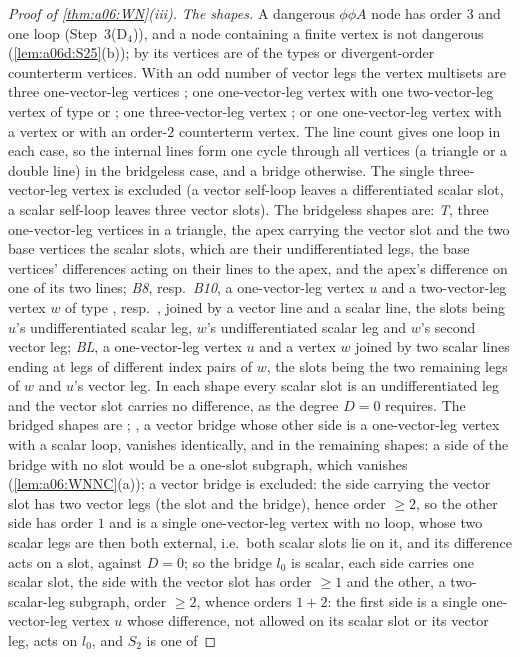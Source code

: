 
\begin{proof}[Proof of \cref{thm:a06:WN}\textup{(iii)}]
\emph{The shapes.} A dangerous $\phi\phi A$ node has order $3$ and one loop (Step~3(D$_4$)), and a node containing a finite \cite[(1.7)]{Ba3} vertex is not dangerous (\cref{lem:a06d:S25}(b)); by \cite[p.~429]{Ba3} its vertices are of the types \cite[(1.6)--(1.8), (1.10)]{Ba3} or divergent-order counterterm vertices. With an odd number of vector legs the vertex multisets are three one-vector-leg vertices \cite[(1.8)]{Ba3}; one one-vector-leg vertex with one two-vector-leg vertex of type \cite[(1.8)]{Ba3} or \cite[(1.10)]{Ba3}; one three-vector-leg vertex \cite[(1.8)]{Ba3}; or one one-vector-leg vertex with a \cite[(1.6)]{Ba3} vertex or with an order-$2$ counterterm vertex. The line count gives one loop in each case, so the internal lines form one cycle through all vertices (a triangle or a double line) in the bridgeless case, and a bridge otherwise. The single three-vector-leg vertex is excluded (a vector self-loop leaves a differentiated scalar slot, a scalar self-loop leaves three vector slots). The bridgeless shapes are: \emph{T}, three one-vector-leg vertices in a triangle, the apex carrying the vector slot and the two base vertices the scalar slots, which are their undifferentiated legs, the base vertices' differences acting on their lines to the apex, and the apex's difference on one of its two lines; \emph{B8}, resp.\ \emph{B10}, a one-vector-leg vertex $u$ and a two-vector-leg vertex $w$ of type \cite[(1.8)]{Ba3}, resp.\ \cite[(1.10)]{Ba3}, joined by a vector line and a scalar line, the slots being $u$'s undifferentiated scalar leg, $w$'s undifferentiated scalar leg and $w$'s second vector leg; \emph{BL}, a one-vector-leg vertex $u$ and a \cite[(1.6)]{Ba3} vertex $w$ joined by two scalar lines ending at legs of different index pairs of $w$, the slots being the two remaining legs of $w$ and $u$'s vector leg. In each shape every scalar slot is an undifferentiated leg and the vector slot carries no difference, as the degree $D=0$ requires. The bridged shapes are \cite[(2.21a)--(g)]{Ba3}; \cite[(2.21a)]{Ba3}, a vector bridge whose other side is a one-vector-leg vertex with a scalar loop, vanishes identically, and in the remaining shapes: a side of the bridge with no slot would be a one-slot subgraph, which vanishes (\cref{lem:a06:WNNC}(a)); a vector bridge is excluded: the side carrying the vector slot has two vector legs (the slot and the bridge), hence order $\ge2$, so the other side has order $1$ and is a single one-vector-leg vertex with no loop, whose two scalar legs are then both external, i.e.\ both scalar slots lie on it, and its difference acts on a slot, against $D=0$; so the bridge $l_0$ is scalar, each side carries one scalar slot, the side with the vector slot has order $\ge1$ and the other, a two-scalar-leg subgraph, order $\ge2$, whence orders $1+2$: the first side is a single one-vector-leg vertex $u$ whose difference, not allowed on its scalar slot or its vector leg, acts on $l_0$, and $S_2$ is one of 
\end{proof}
